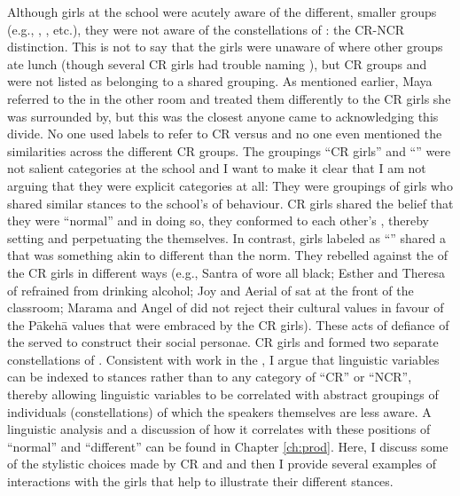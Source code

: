 \largerpage[-1]
Although girls at the school were acutely aware of the different, smaller groups (e.g., , , etc.), they were not aware of the constellations of : the CR-NCR distinction. This is not to say that the girls were unaware of where other groups ate lunch (though several CR girls had trouble naming ), but CR groups and  were not listed as belonging to a shared grouping.  As mentioned earlier, Maya referred to the  in the other room and treated them differently to the CR girls she was surrounded by, but this was the closest anyone came to acknowledging this divide. No one used labels to refer to CR versus  and no one even mentioned the similarities across the different CR groups. The groupings ``CR girls'' and ``'' were not salient categories at the school and I want to make it clear that I am not arguing that they were explicit categories at all: They were groupings of girls who shared similar stances to the school's  of behaviour. CR girls shared the belief that they were ``normal'' and in doing so, they conformed to each other's , thereby setting and perpetuating the  themselves. In contrast, girls labeled as ``'' shared a  that was something akin to different than the norm. They rebelled against the  of the CR girls in different ways (e.g., Santra of  wore all black; Esther and Theresa of  refrained from drinking alcohol; Joy and Aerial of  sat at the front of the classroom; Marama and Angel of  did not reject their cultural values in favour of the P\=akeh\=a values that were embraced by the CR girls). These acts of defiance of the  served to construct their social personae. CR girls and  formed two separate constellations of . Consistent with work in the , I argue that linguistic variables can be indexed to stances rather than to any category of ``CR'' or ``NCR'', thereby allowing linguistic variables to be correlated with abstract groupings of individuals (constellations) of which the speakers themselves are less aware. A linguistic analysis and a discussion of how it correlates with these positions of ``normal'' and ``different'' can be found in Chapter \ref{ch:prod}. Here, I discuss some of the stylistic choices made by CR and  and then I provide several examples of interactions with the girls that help to illustrate their different stances. 

